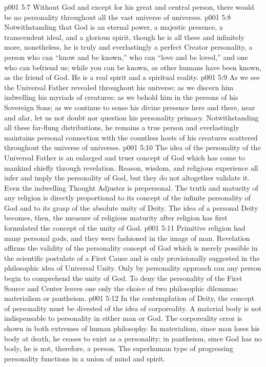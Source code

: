 \pc \vs p001 5:7 Without God and except for his great and central person, there would be no personality throughout all the vast universe of universes. 
\pc \vs p001 5:8 Notwithstanding that God is an eternal power, a majestic presence, a transcendent ideal, and a glorious spirit, though he is all these and infinitely more, nonetheless, he is truly and everlastingly a perfect Creator personality, a person who can “know and be known,” who can “love and be loved,” and one who can befriend us; while you can be known, as other humans have been known, as the friend of God. He is a real spirit and a spiritual reality.
\vs p001 5:9 As we see the Universal Father revealed throughout his universe; as we discern him indwelling his myriads of creatures; as we behold him in the persons of his Sovereign Sons; as we continue to sense his divine presence here and there, near and afar, let us not doubt nor question his personality primacy. Notwithstanding all these far\hyp{}flung distributions, he remains a true person and everlastingly maintains personal connection with the countless hosts of his creatures scattered throughout the universe of universes.
\pc \vs p001 5:10 The idea of the personality of the Universal Father is an enlarged and truer concept of God which has come to mankind chiefly through revelation. Reason, wisdom, and religious experience all infer and imply the personality of God, but they do not altogether validate it. Even the indwelling Thought Adjuster is prepersonal. The truth and maturity of any religion is directly proportional to its concept of the infinite personality of God and to its grasp of the absolute unity of Deity. The idea of a personal Deity becomes, then, the measure of religious maturity after religion has first formulated the concept of the unity of God.
\vs p001 5:11 Primitive religion had many personal gods, and they were fashioned in the image of man. Revelation affirms the validity of the personality concept of God which is merely possible in the scientific postulate of a First Cause and is only provisionally suggested in the philosophic idea of Universal Unity. Only by personality approach can any person begin to comprehend the unity of God. To deny the personality of the First Source and Center leaves one only the choice of two philosophic dilemmas: materialism or pantheism.
\vs p001 5:12 In the contemplation of Deity, the concept of personality must be divested of the idea of corporeality. A material body is not indispensable to personality in either man or God. The corporeality error is shown in both extremes of human philosophy. In materialism, since man loses his body at death, he ceases to exist as a personality; in pantheism, since God has no body, he is not, therefore, a person. The superhuman type of progressing personality functions in a union of mind and spirit.
